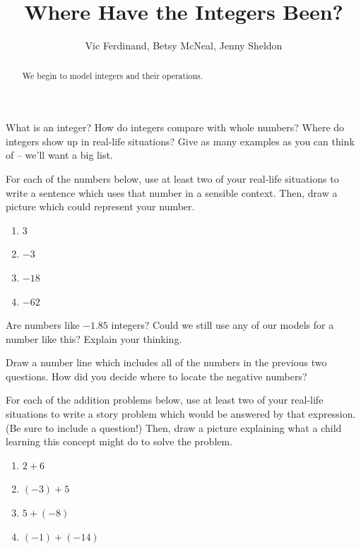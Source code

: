 \documentclass[ nooutcomes,noauthor,handout]{ximera}
\title{Where Have the Integers Been?}
\author{Vic Ferdinand, Betsy McNeal, Jenny Sheldon}
\begin{document}
\begin{abstract}
    We begin to model integers and their operations.
\end{abstract}
\maketitle



\begin{problem}
What is an integer?  How do integers compare with whole numbers?  Where do integers show up in real-life situations?  Give as many examples as you can think of -- we'll want a big list.
\end{problem}

\begin{problem}
For each of the numbers below, use at least two of your real-life situations to write a sentence which uses that number in a sensible context.  Then, draw a picture which could represent your number.
\begin{enumerate}
    \item $3$
    \item $-3$
    \item $-18$
    \item $-62$
\end{enumerate}

\end{problem}

\begin{problem}
	Are numbers like $-1.85$ integers? Could we still use any of our models for a number like this? Explain your thinking.
\end{problem}

\begin{problem}
Draw a number line which includes all of the numbers in the previous two questions.  How did you decide where to locate the negative numbers?
\end{problem}

\begin{problem}
For each of the addition problems below, use at least two of your real-life situations to write a story problem which would be answered by that expression.  (Be sure to include a question!)  Then, draw a picture explaining what a child learning this concept might do to solve the problem.
\begin{enumerate}
    \item $2+6$
    \item $(-3) + 5$
    \item $5 + (-8)$
    \item $(-1) + (-14)$
\end{enumerate}

\end{problem}
\end{document}
